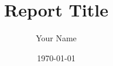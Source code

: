 \usepackage{graphicx}
\usepackage{times}
\usepackage{amsmath}
\usepackage{parskip}
\usepackage[a4paper,left=1.5in,right=1in,top=1in,bottom=1in]{geometry}
\linespread{1.5}
\setlength{\parskip}{0pt}
\fontsize{12}{14.4}
\title{Report Title}
\author{Your Name}
\date{\today}






